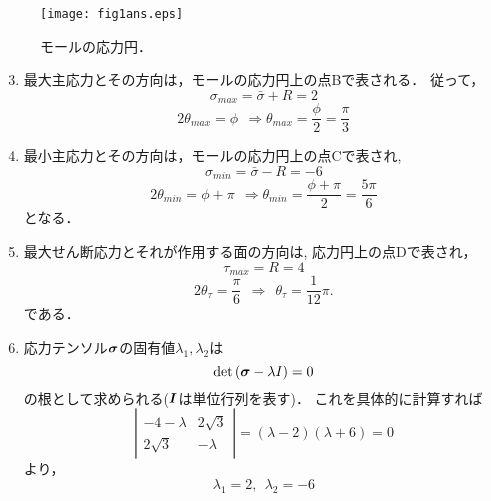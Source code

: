 \documentclass[10pt,a4j]{jarticle}
\begin{document}
\begin{figure}[h]
	\begin{center}
	\texttt{[image: fig1ans.eps]} 
	\end{center}
	\caption{モールの応力円．} 
	\label{fig:fig1}
\end{figure}
%

\begin{enumerate}
\setcounter{enumi}{2}
\item
最大主応力とその方向は，モールの応力円上の点Bで表される．
従って，
\begin{equation}
	\sigma_{max}=\bar\sigma+R=2
\end{equation}
\begin{equation}
	2\theta_{max}=\phi 
	\ \ \Rightarrow 	
	\theta_{max}=\frac{\phi}{2} =\frac{\pi}{3} 
\end{equation}
\item
最小主応力とその方向は，モールの応力円上の点Cで表され, 
\begin{equation}
	\sigma_{min}=\bar\sigma-R=-6
\end{equation}
\begin{equation}
	2\theta_{min}=\phi+\pi 
	\ \ \Rightarrow 	
	\theta_{min}=\frac{\phi+\pi}{2} =\frac{5\pi}{6} 
\end{equation}
となる．
\item
最大せん断応力とそれが作用する面の方向は, 応力円上の点Dで表され，
\begin{equation}
	\tau_{max}=R=4
\end{equation}
\begin{equation}
	2\theta_{\tau}=\frac{\pi}{6}  \ \ \Rightarrow \ \ 
	\theta_{\tau}=\frac{1}{12}\pi.
\end{equation}
である．
\item
応力テンソル$\mbox{\boldmath $\sigma$}$の固有値$\lambda_1,\lambda_2$は
\begin{equation}
	\det \left( \mbox{\boldmath $\sigma$}-\lambda I  \right) =0
\end{equation}
の根として求められる($\mbox{\boldmath $I$}$は単位行列を表す)．
これを具体的に計算すれば
\begin{equation}
	\left| 
		\begin{array}{cc}
		-4-\lambda & 2\sqrt{3} \\
		2\sqrt{3} & -\lambda 
		\end{array}
	\right|
	=
	(\lambda-2)(\lambda+6)=0
\end{equation}
より，
\begin{equation}
	\lambda_1 = 2, \ \ \lambda_2 = -6

\end{equation}
\end{enumerate}
\end{document}
